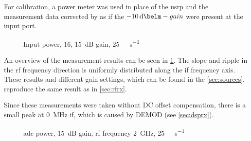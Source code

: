 \documentclass[12pt,a4paper,parskip=full,abstracton]{scrartcl}
\begin{document}
For calibration, a power meter was used in place of the \gls{usrp} and the measurement
data corrected by as if the $\SI{-10}{\deci\belm}-gain$ were present at the input port.

\begin{figure}[htb]
    \centering
{}
    \caption{Input power, \SI{16}{\bit}, \SI{15}{\deci\bel} gain, \SI{25}{\mega\samples\per\second}}
    \label{fig:rfifrx16}
\end{figure}

An overview of the measurement results can be seen in \cref{fig:rfifrx16}. The slope and ripple
in the \gls{rf} frequency direction is uniformly distributed along the \gls{if} frequency axis.
These results and different gain settings, which can be found in the \cref{sec:sources},
reproduce the same result as in \cref{sec:rfrx}.

Since these measurements were taken without DC offset compensation, there is a small peak at 
\SI{0}{\mega\hertz} \gls{if}, which is caused by DEMOD (see \cref{sec:dsprx}).

\begin{figure}[htb]
    \centering
{}
    \caption{\gls{adc} power, \SI{15}{\deci\bel} gain, \gls{rf} frequency \SI{2}{\giga\hertz}, \SI{25}{\mega\samples\per\second}}
    \label{fig:ifrx25}
\end{figure}
\end{document}
